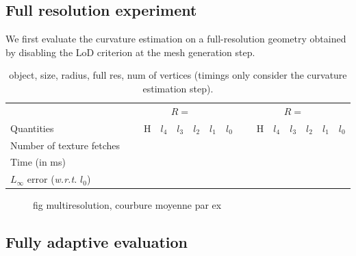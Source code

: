 \documentclass{llncs}
\newcommand{\wrt}{\emph{w.r.t.} }
\begin{document}
\subsection{Full resolution experiment}

We first evaluate the curvature estimation on a full-resolution
geometry obtained by disabling the LoD criterion at the mesh
generation step.


\begin{table}
  \begin{center}
    \begin{tabular}{@{}lrrrrrrrrrrrr@{}}
      \toprule
      & \multicolumn{6}{c}{$R=$}   & \multicolumn{6}{c}{$R=$}\\
      \cmidrule(r){2-12}
    Quantities & ~~~H & $l_4$ & $l_3$ & $l_2$ & $l_1$ & $l_0$& ~~~H & $l_4$ & $l_3$ & $l_2$ & $l_1$ & $l_0$\\
      \midrule
      Number of texture fetches & & & & & & & & & & & &\\
      Time (in ms) & & & & & && & & & & &\\
      $L_\infty$ error (\wrt $l_0$) & & & & & && & & & & &\\
      \bottomrule
    \end{tabular}
  \end{center}
  \caption{object, size, radius, full res, num of vertices (timings
    only consider the curvature estimation step).\label{tab:full-res-stat}}
\end{table}

\begin{figure}
  \begin{center}
  \end{center}
  \caption{fig multiresolution, courbure moyenne par ex}
  \label{fig:refine}
\end{figure}


\subsection{Fully adaptive evaluation}
\end{document}

